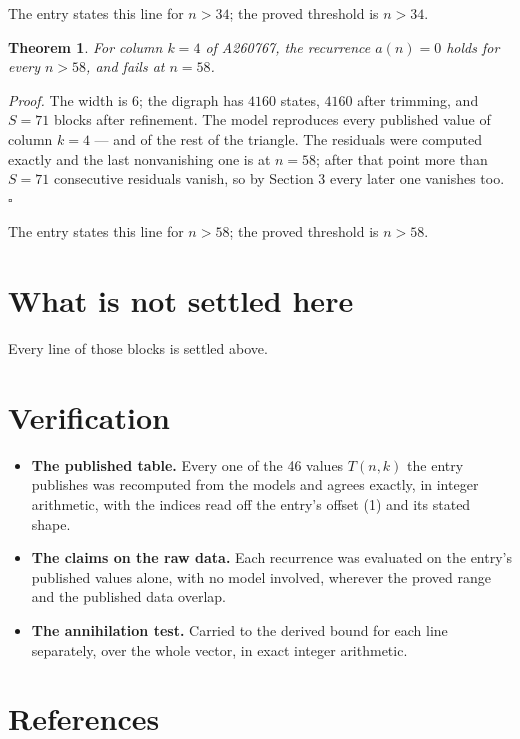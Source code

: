 \documentclass[11pt]{article}
\newtheorem{theorem}{Theorem}
\theoremstyle{definition}
\begin{document}
The entry states this line for $n > 34$; the proved threshold is $n > 34$.

\begin{theorem} For column $k = 4$ of A260767, the recurrence $a(n) = 0$ holds for every $n > 58$, and fails at $n = 58$.\end{theorem}

{\itshape Proof.} The width is $6$; the digraph has $4160$ states, $4160$ after trimming, and $S = 71$ blocks after refinement. The model reproduces every published value of column $k = 4$ --- and of the rest of the triangle. The residuals were computed exactly and the last nonvanishing one is at $n = 58$; after that point more than $S = 71$ consecutive residuals vanish, so by Section 3 every later one vanishes too. $\square$

The entry states this line for $n > 58$; the proved threshold is $n > 58$.

\section{What is not settled here}

Every line of those blocks is settled above.

\section{Verification}

\begin{itemize}

\item {\bfseries The published table.} Every one of the 46 values $T(n,k)$ the entry publishes was recomputed from the models and agrees exactly, in integer arithmetic, with the indices read off the entry's offset (1) and its stated shape.

\item {\bfseries The claims on the raw data.} Each recurrence was evaluated on the entry's published values alone, with no model involved, wherever the proved range and the published data overlap.

\item {\bfseries The annihilation test.} Carried to the derived bound for each line separately, over the whole vector, in exact integer arithmetic.

\end{itemize}

\section{References}
\end{document}
